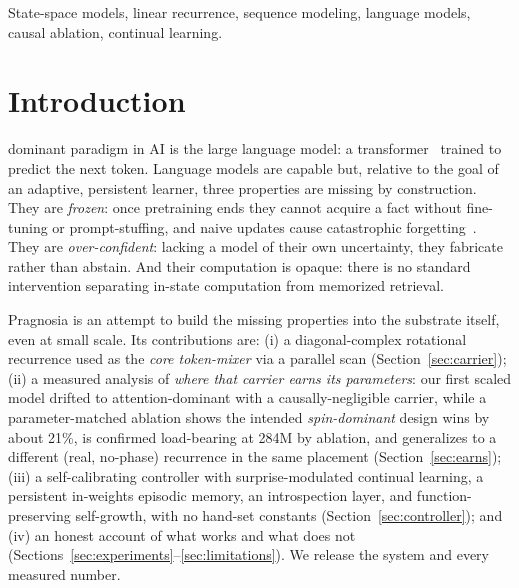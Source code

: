 \documentclass[journal]{IEEEtran}
\begin{document}
\begin{IEEEkeywords}
State-space models, linear recurrence, sequence modeling, language models, causal ablation, continual learning.
\end{IEEEkeywords}

\section{Introduction}
 dominant paradigm in AI is the large language model: a transformer~\cite{vaswani2017} trained to predict the next token. Language models are capable but, relative to the goal of an adaptive, persistent learner, three properties are missing by construction. They are \emph{frozen}: once pretraining ends they cannot acquire a fact without fine-tuning or prompt-stuffing, and naive updates cause catastrophic forgetting~\cite{mccloskey1989}. They are \emph{over-confident}: lacking a model of their own uncertainty, they fabricate rather than abstain. And their computation is opaque: there is no standard intervention separating in-state computation from memorized retrieval.

Pragnosia is an attempt to build the missing properties into the substrate itself, even at small scale. Its contributions are: (i) a diagonal-complex rotational recurrence used as the \emph{core token-mixer} via a parallel scan (Section~\ref{sec:carrier}); (ii) a measured analysis of \emph{where that carrier earns its parameters}: our first scaled model drifted to attention-dominant with a causally-negligible carrier, while a parameter-matched ablation shows the intended \emph{spin-dominant} design wins by about 21\%, is confirmed load-bearing at 284M by ablation, and generalizes to a different (real, no-phase) recurrence in the same placement (Section~\ref{sec:earns}); (iii) a self-calibrating controller with surprise-modulated continual learning, a persistent in-weights episodic memory, an introspection layer, and function-preserving self-growth, with no hand-set constants (Section~\ref{sec:controller}); and (iv) an honest account of what works and what does not (Sections~\ref{sec:experiments}--\ref{sec:limitations}). We release the system and every measured number.
\end{document}
